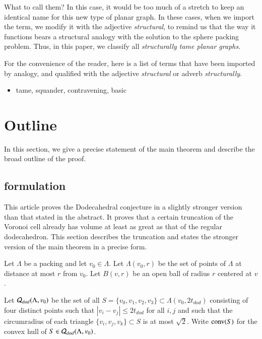 What to call them?  In this case, it would be too much of a stretch
to keep an identical name for this new type of planar graph.
In these cases, when we import the term, we modify it with
the adjective {\it structural}, to remind us that the way it functions 
bears a structural
analogy with the solution to the sphere
packing problem.  Thus, in this paper, we classify all
{\it structurally tame planar graphs}.

For the convenience of the reader, here is a list of terms that
have been imported by analogy, and qualified with the adjective
{\it structural} or adverb {\it structurally}.

\begin{itemize}
\item tame, squander, contravening, basic
\end{itemize}




\section{Outline}

In this section, we give a precise statement of the main theorem
and describe the broad outline of the proof.


\subsection{formulation}\label{sec:form}

This article proves the Dodecahedral conjecture in a slightly
stronger version than that stated in the abstract.  It proves
that a certain truncation of the Voronoi cell already has volume
at least as great as that of the regular dodecahedron.  This
section describes the truncation and states the stronger version
of the main theorem in a precise form.

Let $\Lambda$ be a packing and let $v_0\in\Lambda$.
Let $\Lambda(v_0,r)$ be the set of points of $\Lambda$ at distance at most $r$ from $v_0$.
Let $B(v,r)$ be an open ball
of radius $r$ centered at $v$.  

Let ${\mathcal Q}_{dod}(\Lambda,v_0)$ 
be the set of all $S=\{v_0,v_1,v_2,v_3\}\subset\Lambda(v_0,2t_{dod})$
consisting of four distinct points such that $|v_i-v_j|\le 2t_{dod}$ for all $i,j$
and such that the circumradius of each triangle $\{v_i,v_j,v_k\}\subset S$ is at most
$\sqrt2$.   Write ${\operatorname{conv}}(S)$ for the convex hull of $S\in{\mathcal Q}_{dod}(\Lambda,v_0)$. 


